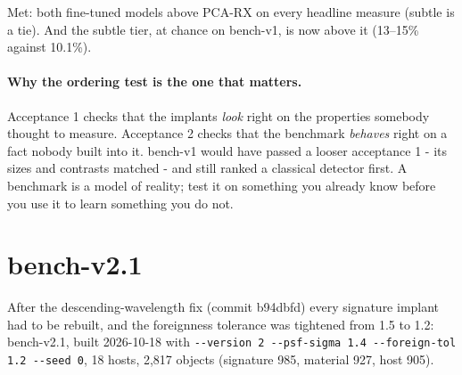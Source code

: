 Met: both fine-tuned models above PCA-RX on every headline measure (subtle is a tie). And the subtle tier, at chance on
bench-v1, is now above it (13--15\% against 10.1\%).



\paragraph{Why the ordering test is the one that matters.} Acceptance 1 checks that the implants \emph{look} right on
the properties somebody thought to measure. Acceptance 2 checks that the benchmark \emph{behaves} right on a fact
nobody built into it. bench-v1 would have passed a looser acceptance 1 - its sizes and contrasts matched - and still
ranked a classical detector first. A benchmark is a model of reality; test it on something you already know before you
use it to learn something you do not.

\section{bench-v2.1}\label{sec:benchmarks:v21}

After the descending-wavelength fix (commit b94dbfd) every signature implant had to be rebuilt, and the foreignness
tolerance was tightened from 1.5 to 1.2: bench-v2.1, built 2026-10-18 with \texttt{-{}-version 2 -{}-psf-sigma 1.4
-{}-foreign-tol 1.2 -{}-seed 0}, 18 hosts, 2,817 objects (signature 985, material 927, host 905).

